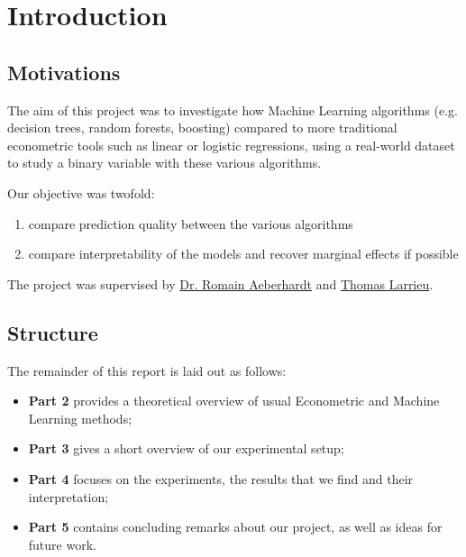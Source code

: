 \chapter{Introduction}

\section{Motivations}
The aim of this project was to investigate how Machine Learning algorithms (e.g. decision trees, random forests, boosting) compared to more traditional econometric tools such as linear or logistic regressions, using a real-world dataset \cite{enquete} to study a binary variable with these various algorithms.

Our objective was twofold:
\begin{enumerate}[nosep]
    \item compare prediction quality between the various algorithms
    \item compare interpretability of the models and recover marginal effects if possible
\end{enumerate}

The project was supervised by \href{http://www.crest.fr/pagesperso.php?user=3045}{Dr. Romain Aeberhardt} and \href{http://thomas-larrieu.strikingly.com/}{Thomas Larrieu}.

\section{Structure}
The remainder of this report is laid out as follows:
    \begin{itemize}
        \item \textbf{Part 2} provides a theoretical overview of usual Econometric and Machine Learning methods;
        \item \textbf{Part 3} gives a short overview of our experimental setup;
        \item \textbf{Part 4} focuses on the experiments, the results that we find and their interpretation;
        \item \textbf{Part 5} contains concluding remarks about our project, as well as ideas for future work.
    \end{itemize}

\newpage\null\thispagestyle{empty}\newpage  %
